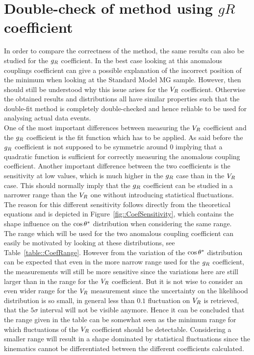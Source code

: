\section{Double-check of method using $gR$ coefficient}
In order to compare the correctness of the method, the same results can also be studied for the $g_{R}$ coefficient. In the best case looking at this anomalous couplings coefficient can give a possible explanation of the incorrect position of the minimum when looking at the Standard Model MG sample. However, then should still be understood why this issue arises for the $V_{R}$ coefficient.
Otherwise the obtained results and distributions all have similar properties such that the double-fit method is completely double-checked and hence reliable to be used for analysing actual data events.
\\

One of the most important differences between measuring the $V_{R}$ coefficient and the $g_{R}$ coefficient is the fit function which has to be applied. As said before the $g_{R}$ coefficient is not supposed to be symmetric around $0$ implying that a quadratic function is sufficient for correctly measuring the anomalous coupling coefficient. Another important difference between the two coefficients is the sensitivity at low values, which is much higher in the $g_{R}$ case than in the $V_{R}$ case. This should normally imply that the $g_{R}$ coefficient can be studied in a narrower range than the $V_{R}$ one without introducing statistical fluctuations.\\
The reason for this different sensitivity follows directly from the theoretical equations and is depicted in Figure~\ref{fig::CoefSensitivity}, which contains the shape influence on the $\cos \theta^{*}$ distribution when considering the same range.\\
The range which will be used for the two anomalous coupling coefficient can easily be motivated by looking at these distributions, see Table~\ref{table::CoefRange}. However from the variation of the $\cos \theta^{*}$ distribution can be expected that even in the more narrow range used for the $g_{R}$ coefficient, the measurements will still be more sensitive since the variations here are still larger than in the range for the $V_{R}$ coefficient. But it is not wise to consider an even wider range for the $V_{R}$ measurement since the uncertainty on the likelihood distribution is so small, in general less than $0.1$ fluctuation on $V_{R}$ is retrieved, that the $5\sigma$ interval will not be visible anymore. Hence it can be concluded that the range given in the table can be somewhat seen as the minimum range for which fluctuations of the $V_{R}$ coefficient should be detectable. Considering a smaller range will result in a shape dominated by statistical fluctuations since the kinematics cannot be differentiated between the different coefficients calculated.

